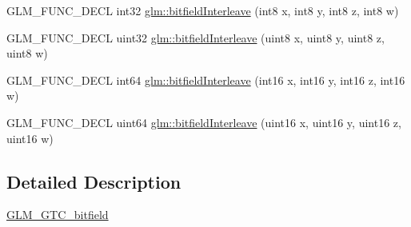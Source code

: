 \begin{DoxyCompactItemize}
G\+L\+M\+\_\+\+F\+U\+N\+C\+\_\+\+D\+E\+CL int32 \hyperlink{group__gtc__bitfield_ga7da84ecc2b3a46c9c08a9f40012359cf}{glm\+::bitfield\+Interleave} (int8 x, int8 y, int8 z, int8 w)
\item 
G\+L\+M\+\_\+\+F\+U\+N\+C\+\_\+\+D\+E\+CL uint32 \hyperlink{group__gtc__bitfield_ga447c0bbed9d60c14578626d8f03f3755}{glm\+::bitfield\+Interleave} (uint8 x, uint8 y, uint8 z, uint8 w)
\item 
G\+L\+M\+\_\+\+F\+U\+N\+C\+\_\+\+D\+E\+CL int64 \hyperlink{group__gtc__bitfield_ga09ee0be0fac790a1607a711e597dd9bf}{glm\+::bitfield\+Interleave} (int16 x, int16 y, int16 z, int16 w)
\item 
G\+L\+M\+\_\+\+F\+U\+N\+C\+\_\+\+D\+E\+CL uint64 \hyperlink{group__gtc__bitfield_gac8a926a7bfd9b23c22a4f685193fbfe1}{glm\+::bitfield\+Interleave} (uint16 x, uint16 y, uint16 z, uint16 w)
\end{DoxyCompactItemize}


\subsection{Detailed Description}
\hyperlink{group__gtc__bitfield}{G\+L\+M\+\_\+\+G\+T\+C\+\_\+bitfield} 